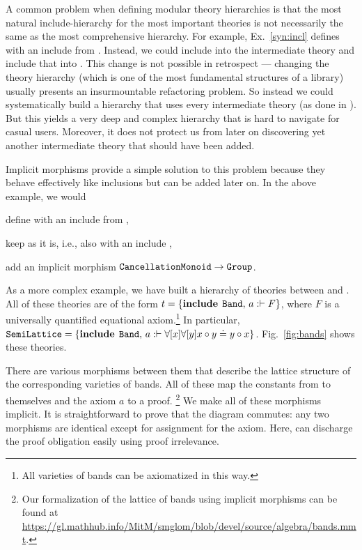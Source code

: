 A common problem when defining modular theory hierarchies is that the most natural include-hierarchy for the most important theories is not necessarily the same as the most comprehensive hierarchy.
For example, Ex.~\ref{syn:incl} defines  with an include from .
Instead, we could include  into the intermediate theory  and include that into .
This change is not possible in retrospect --- changing the theory hierarchy (which is one of the most fundamental structures of a library) usually presents an insurmountable refactoring problem.
So instead we could systematically build a hierarchy that uses every intermediate theory (as done in \cite{mathscheme}).
But this yields a very deep and complex hierarchy that is hard to navigate for casual users.
Moreover, it does not protect us from later on discovering yet another intermediate theory that should have been added.

Implicit morphisms provide a simple solution to this problem because they behave effectively like inclusions but can be added later on.
In the above example, we would
\begin{compactitem}
 \item define  with an include from ,
 \item keep  as it is, i.e., also with an include ,
 \item add an implicit morphism $\operatorname{\mathtt{CancellationMonoid}}\to\operatorname{\mathtt{Group}}$.
\end{compactitem}
\medskip

As a more complex example, we have built a hierarchy of theories between  and .
All of these theories are of the form $t=\{\operatorname{\mathbf{include}}{\;\operatorname{\mathtt{Band}}},\,a:\vdash F\}$, where $F$ is a universally quantified equational axiom.\footnote{All varieties of bands can be axiomatized in this way.}
In particular, $\operatorname{\mathtt{SemiLattice}}=\{\operatorname{\mathbf{include}}{\;\operatorname{\mathtt{Band}}},\,a:\vdash \forall [x]\forall [y] x\circ y\doteq y\circ x\}$.
Fig.~\ref{fig:bands} shows these theories.

There are various morphisms between them that describe the lattice structure of the corresponding varieties of bands.
All of these map the constants from  to themselves and the axiom $a$ to a proof.%
\footnote{Our formalization of the lattice of bands using implicit morphisms can be found at \url{https://gl.mathhub.info/MitM/smglom/blob/devel/source/algebra/bands.mmt}.}
We make all of these morphisms implicit.
It is straightforward to prove that the diagram commutes: any two morphisms are identical except for assignment for the axiom.
Here, \mmt can discharge the proof obligation easily using proof irrelevance.

